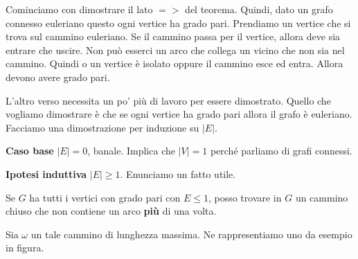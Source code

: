 \documentclass[12pt]{report}
\begin{document}
\begin{dimo}
    Cominciamo con dimostrare il lato $=>$ del teorema. Quindi, dato un grafo connesso euleriano questo ogni vertice ha grado pari. Prendiamo un vertice che si trova sul cammino euleriano.
    \noindent
    Se il cammino passa per il vertice, allora deve sia entrare che uscire. Non può esserci un arco che collega un vicino che non sia nel cammino. Quindi o un vertice è isolato oppure il cammino esce ed entra. Allora devono avere grado pari.
    
    L'altro verso necessita un po' più di lavoro per essere dimostrato. Quello che vogliamo dimostrare è che se ogni vertice ha grado pari allora il grafo è euleriano.  Facciamo una dimostrazione per induzione su $|E|$.

    \noindent 
    \textbf{Caso base} $|E| = 0$, banale. Implica che $|V| = 1$ perché parliamo di grafi connessi.

    \noindent 
    \textbf{Ipotesi induttiva} $|E| \geq  1$. Enunciamo un fatto utile.

    \begin{fatto}
        Se $G$ ha tutti i vertici con grado pari con $E \leq 1$, posso trovare in $G$ un cammino chiuso che non contiene un arco \textbf{più} di una volta. 
    \end{fatto}

    \noindent
    Sia $\omega$ un tale cammino di lunghezza massima. Ne rappresentiamo uno da esempio in figura.
    


\end{dimo}
\end{document}
